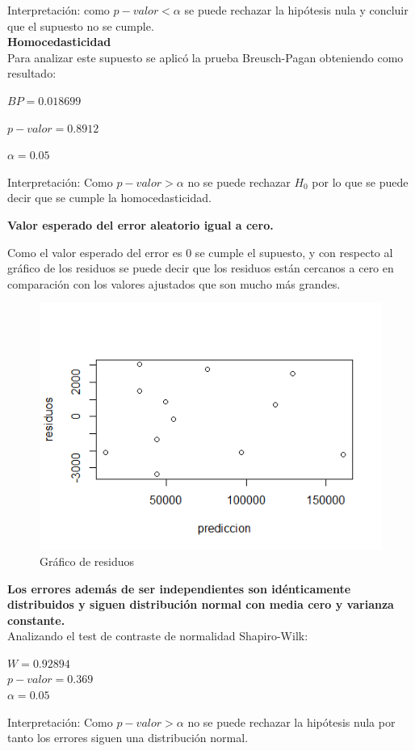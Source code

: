 \documentclass[12pt,a4paper]{article}
\begin{document}
	Interpretación: como $p-valor < \alpha$ se puede rechazar la hipótesis nula y concluir que el supuesto no se cumple.\\
	
	\textbf{Homocedasticidad}\\
	Para analizar este supuesto se aplicó la prueba Breusch-Pagan obteniendo como resultado:
	
	\begin{center}
		$BP = 0.018699$
		
		$p-valor = 0.8912$
		
		$\alpha = 0.05$
	\end{center}
	
	
	Interpretación: Como $p-valor > \alpha$ no se puede rechazar $H_0$ por lo que se puede decir que se cumple la homocedasticidad.\\
	\newpage
	
	\textbf{Valor esperado del error aleatorio igual a cero.}
	
	Como el valor esperado del error es 0 se cumple el supuesto, y con respecto al gráfico de los residuos se puede decir que los residuos están cercanos a cero en comparación con los valores ajustados que son mucho más grandes.
	
	
	\begin{figure}[!h]
		\centering
		\includegraphics[scale=0.5]{./images/PLOT2.png}
		\caption{\small{Gráfico de residuos }}
	\end{figure}
	
	
	\textbf{Los errores además de ser independientes son idénticamente distribuidos y siguen distribución normal con media cero y varianza constante.}\\
	Analizando el test de contraste de normalidad Shapiro-Wilk:
	\begin{center}
		$W = 0.92894$ \\
		$p-valor = 0.369$\\
		$\alpha = 0.05$
	\end{center}
	Interpretación: Como $p-valor > \alpha$ no se puede rechazar la hipótesis nula por tanto los errores siguen una distribución normal.
	
\end{document}
